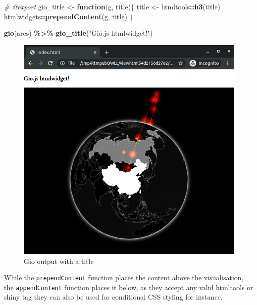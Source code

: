 \documentclass[
]{krantz}
\makeatletter
\newenvironment{Shaded}{\begin{snugshade}}{\end{snugshade}}
\newcommand{\CommentTok}[1]{\textcolor[rgb]{0.37,0.37,0.37}{\textit{#1}}}
\newcommand{\ControlFlowTok}[1]{\textcolor[rgb]{0.27,0.27,0.27}{\textbf{#1}}}
\newcommand{\KeywordTok}[1]{\textcolor[rgb]{0.27,0.27,0.27}{\textbf{#1}}}
\newcommand{\NormalTok}[1]{#1}
\newcommand{\OperatorTok}[1]{\textcolor[rgb]{0.43,0.43,0.43}{\textbf{#1}}}
\newcommand{\StringTok}[1]{\textcolor[rgb]{0.5,0.5,0.5}{#1}}
\newenvironment{kframe}{%
\medskip{}
\setlength{\fboxsep}{.8em}
 \def\at@end@of@kframe{}%
 \ifinner\ifhmode%
  \def\at@end@of@kframe{\end{minipage}}%
  \begin{minipage}{\columnwidth}%
 \fi\fi%
 \def\FrameCommand##1{\hskip\@totalleftmargin \hskip-\fboxsep
 \colorbox{shadecolor}{##1}\hskip-\fboxsep
     \hskip-\linewidth \hskip-\@totalleftmargin \hskip\columnwidth}%
 \MakeFramed {\advance\hsize-\width
   \@totalleftmargin\z@ \linewidth\hsize
   \@setminipage}}%
 {\par\unskip\endMakeFramed%
 \at@end@of@kframe}
\renewenvironment{Shaded}{\begin{kframe}}{\end{kframe}}
\makeatother
\begin{document}
\begin{Shaded}
\begin{Highlighting}[]
\CommentTok{\#\textquotesingle{} @export}
\NormalTok{gio\_title \textless{}{-}}\StringTok{ }\ControlFlowTok{function}\NormalTok{(g, title)\{}
\NormalTok{  title \textless{}{-}}\StringTok{ }\NormalTok{htmltools}\OperatorTok{::}\KeywordTok{h3}\NormalTok{(title)}
\NormalTok{  htmlwidgets}\OperatorTok{::}\KeywordTok{prependContent}\NormalTok{(g, title)}
\NormalTok{\}}
\end{Highlighting}
\end{Shaded}

\begin{Shaded}
\begin{Highlighting}[]
\KeywordTok{gio}\NormalTok{(arcs) }\OperatorTok{\%\textgreater{}\%}\StringTok{ }
\StringTok{  }\KeywordTok{gio\_title}\NormalTok{(}\StringTok{"Gio.js htmlwidget!"}\NormalTok{)}
\end{Highlighting}
\end{Shaded}

\begin{figure}
\centering
\includegraphics{images/gio-title.png}
\caption{Gio output with a title}
\end{figure}

While the \texttt{prependContent} function places the content above the visualisation, the \texttt{appendContent} function places it below, as they accept any valid htmltools or shiny tag they can also be used for conditional CSS styling for instance.
\end{document}
